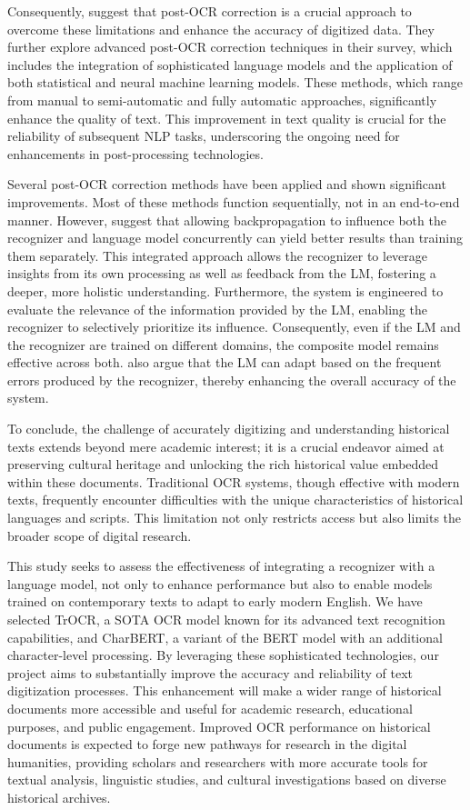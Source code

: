 Consequently, \cite{nguyen2021survey} suggest that post-OCR correction is a crucial approach to overcome these limitations and enhance the accuracy of digitized data. They further explore advanced post-OCR correction techniques in their survey, which includes the integration of sophisticated language models and the application of both statistical and neural machine learning models. These methods, which range from manual to semi-automatic and fully automatic approaches, significantly enhance the quality of text. This improvement in text quality is crucial for the reliability of subsequent NLP tasks, underscoring the ongoing need for enhancements in post-processing technologies.

Several post-OCR correction methods have been applied and shown significant improvements. Most of these methods function sequentially, not in an end-to-end manner. However, \cite{kang2021candidate} suggest that allowing backpropagation to influence both the recognizer and language model concurrently can yield better results than training them separately. This integrated approach allows the recognizer to leverage insights from its own processing as well as feedback from the LM, fostering a deeper, more holistic understanding. Furthermore, the system is engineered to evaluate the relevance of the information provided by the LM, enabling the recognizer to selectively prioritize its influence. Consequently, even if the LM and the recognizer are trained on different domains, the composite model remains effective across both. \cite{kang2021candidate} also argue that the LM can adapt based on the frequent errors produced by the recognizer, thereby enhancing the overall accuracy of the system.

To conclude, the challenge of accurately digitizing and understanding historical texts extends beyond mere academic interest; it is a crucial endeavor aimed at preserving cultural heritage and unlocking the rich historical value embedded within these documents. Traditional OCR systems, though effective with modern texts, frequently encounter difficulties with the unique characteristics of historical languages and scripts. This limitation not only restricts access but also limits the broader scope of digital research.

This study seeks to assess the effectiveness of integrating a recognizer with a language model, not only to enhance performance but also to enable models trained on contemporary texts to adapt to early modern English. We have selected TrOCR, a SOTA OCR model known for its advanced text recognition capabilities, and CharBERT, a variant of the BERT model with an additional character-level processing. By leveraging these sophisticated technologies, our project aims to substantially improve the accuracy and reliability of text digitization processes. This enhancement will make a wider range of historical documents more accessible and useful for academic research, educational purposes, and public engagement. Improved OCR performance on historical documents is expected to forge new pathways for research in the digital humanities, providing scholars and researchers with more accurate tools for textual analysis, linguistic studies, and cultural investigations based on diverse historical archives.

